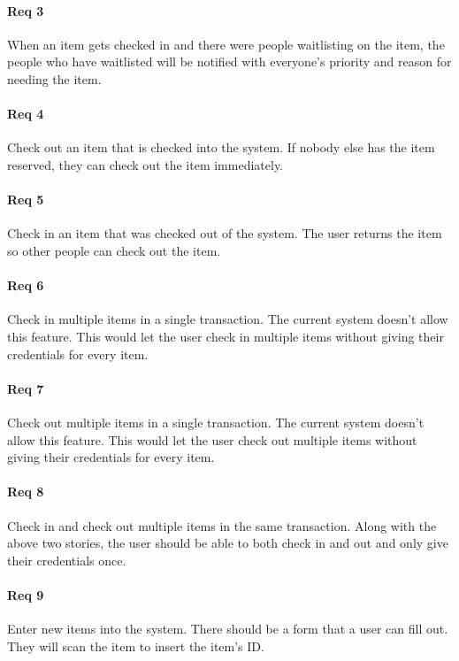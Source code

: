 \documentclass[10pt, onecolumn, twoside, peerreview]{IEEEtran}
\begin{document}
\paragraph*{Req 3} When an item gets checked in and there were people waitlisting on the item, the people who have waitlisted will be
notified with everyone's priority and reason for needing the item.\\

\paragraph*{Req 4} Check out an item that is checked into the system. If nobody else has the item reserved, they can check out the item
immediately.\\

\paragraph*{Req 5} Check in an item that was checked out of the system. The user returns the item so other people can check out the
item.\\

\paragraph*{Req 6} Check in multiple items in a single transaction. The current system doesn't allow this feature. This would let the user
check in multiple items without giving their credentials for every item.\\

\paragraph*{Req 7} Check out multiple items in a single transaction. The current system doesn't allow this feature. This would let the
user check out multiple items without giving their credentials for every item.\\

\paragraph*{Req 8} Check in and check out multiple items in the same transaction. Along with the above two stories, the user should be
able to both check in and out and only give their credentials once.\\

\paragraph*{Req 9} Enter new items into the system. There should be a form that a user can fill out. They will scan the item to insert the
item's ID.\\
\end{document}
